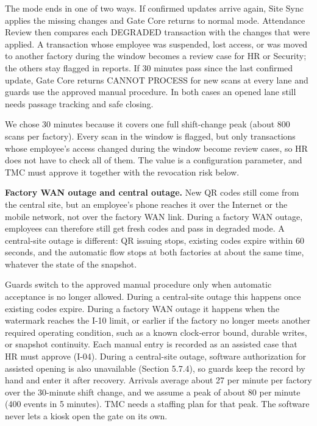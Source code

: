 The mode ends in one of two ways. If confirmed updates arrive again, Site Sync applies the missing changes and Gate Core returns to normal mode. Attendance Review then compares each DEGRADED transaction with the changes that were applied. A transaction whose employee was suspended, lost access, or was moved to another factory during the window becomes a review case for HR or Security; the others stay flagged in reports. If 30 minutes pass since the last confirmed update, Gate Core returns CANNOT PROCESS for new scans at every lane and guards use the approved manual procedure. In both cases an opened lane still needs passage tracking and safe closing.


We chose 30 minutes because it covers one full shift-change peak (about 800 scans per factory). Every scan in the window is flagged, but only transactions whose employee's access changed during the window become review cases, so HR does not have to check all of them. The value is a configuration parameter, and TMC must approve it together with the revocation risk below.


\textbf{Factory WAN outage and central outage.} New QR codes still come from the central site, but an employee's phone reaches it over the Internet or the mobile network, not over the factory WAN link. During a factory WAN outage, employees can therefore still get fresh codes and pass in degraded mode. A central-site outage is different: QR issuing stops, existing codes expire within 60 seconds, and the automatic flow stops at both factories at about the same time, whatever the state of the snapshot.


Guards switch to the approved manual procedure only when automatic acceptance is no longer allowed. During a central-site outage this happens once existing codes expire. During a factory WAN outage it happens when the watermark reaches the I-10 limit, or earlier if the factory no longer meets another required operating condition, such as a known clock-error bound, durable writes, or snapshot continuity. Each manual entry is recorded as an assisted case that HR must approve (I-04). During a central-site outage, software authorization for assisted opening is also unavailable (Section 5.7.4), so guards keep the record by hand and enter it after recovery. Arrivals average about 27 per minute per factory over the 30-minute shift change, and we assume a peak of about 80 per minute (400 events in 5 minutes). TMC needs a staffing plan for that peak. The software never lets a kiosk open the gate on its own.


